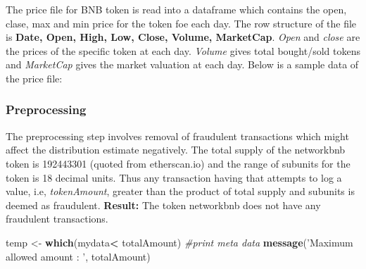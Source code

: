 \documentclass[]{article}
\newenvironment{Shaded}{\begin{snugshade}}{\end{snugshade}}
\newcommand{\KeywordTok}[1]{\textcolor[rgb]{0.13,0.29,0.53}{\textbf{#1}}}
\newcommand{\DataTypeTok}[1]{\textcolor[rgb]{0.13,0.29,0.53}{#1}}
\newcommand{\CharTok}[1]{\textcolor[rgb]{0.31,0.60,0.02}{#1}}
\newcommand{\StringTok}[1]{\textcolor[rgb]{0.31,0.60,0.02}{#1}}
\newcommand{\CommentTok}[1]{\textcolor[rgb]{0.56,0.35,0.01}{\textit{#1}}}
\newcommand{\OtherTok}[1]{\textcolor[rgb]{0.56,0.35,0.01}{#1}}
\newcommand{\OperatorTok}[1]{\textcolor[rgb]{0.81,0.36,0.00}{\textbf{#1}}}
\newcommand{\NormalTok}[1]{#1}
\begin{document}
The price file for BNB token is read into a dataframe which contains the
open, clase, max and min price for the token foe each day. The row
structure of the file is \textbf{Date, Open, High, Low, Close, Volume,
MarketCap}. \emph{Open} and \emph{close} are the prices of the specific
token at each day. \emph{Volume} gives total bought/sold tokens and
\emph{MarketCap} gives the market valuation at each day. Below is a
sample data of the price file:

\begin{Shaded}
\end{Shaded}

\subsubsection{Preprocessing}\label{preprocessing}

The preprocessing step involves removal of fraudulent transactions which
might affect the distribution estimate negatively. The total supply of
the networkbnb token is 192443301 (quoted from etherscan.io) and the
range of subunits for the token is 18 decimal units. Thus any
transaction having that attempts to log a value, i.e,
\emph{tokenAmount}, greater than the product of total supply and
subunits is deemed as fraudulent. \textbf{Result: }The token networkbnb
does not have any fraudulent transactions.

\begin{Shaded}
\begin{Highlighting}[]
\NormalTok{temp <-}\StringTok{ }\KeywordTok{which}\NormalTok{(mydata}\OperatorTok{<}\StringTok{ }\NormalTok{totalAmount)}
\CommentTok{#print meta data }
\KeywordTok{message}\NormalTok{(}\StringTok{'Maximum allowed amount : '}\NormalTok{, totalAmount)}
\end{Highlighting}
\end{Shaded}
\end{document}
